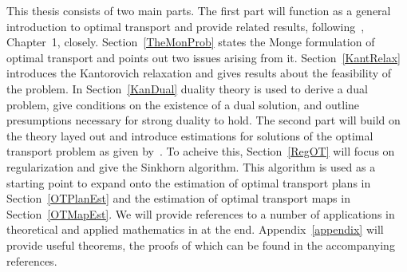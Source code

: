 This thesis consists of two main parts. The first part will function as a general introduction to optimal transport and provide related results, following\ \cite{San2015}, Chapter~1, closely. Section~\ref{TheMonProb} states the Monge formulation of optimal transport and points out two issues arising from it. Section~\ref{KantRelax} introduces the Kantorovich relaxation and gives results about the feasibility of the problem. In Section~\ref{KanDual} duality theory is used to derive a dual problem, give conditions on the existence of a dual solution, and outline presumptions necessary for strong duality to hold. The second part will build on the theory layed out and introduce estimations for solutions of the optimal transport problem as given by\ \cite{Seg2018}. To acheive this, Section~\ref{RegOT} will focus on regularization and give the Sinkhorn algorithm. This algorithm is used as a starting point to expand onto the estimation of optimal transport plans in Section~\ref{OTPlanEst} and the estimation of optimal transport maps in Section~\ref{OTMapEst}. We will provide references to a number of applications in theoretical and applied mathematics in at the end. Appendix~\ref{appendix} will provide useful theorems, the proofs of which can be found in the accompanying references.